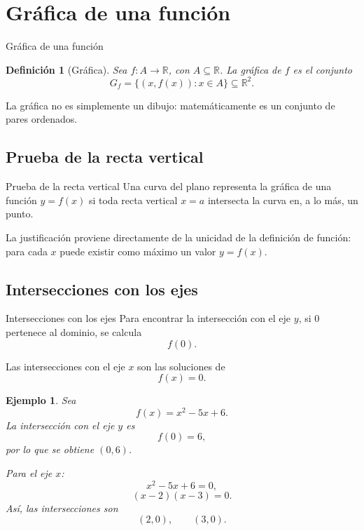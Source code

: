 \documentclass[aspectratio=169,10pt]{beamer}
\newtheorem{definicion}{Definición}
\newtheorem{ejemplo}{Ejemplo}
\newcommand{\R}{\mathbb{R}}
\begin{document}
\section{Gráfica de una función}
\begin{frame}{Gráfica de una función}
\begin{definicion}[Gráfica]
Sea $f:A\to\R$, con $A\subseteq\R$. La gráfica de $f$ es el conjunto
\[
G_f=\{(x,f(x)):x\in A\}\subseteq\R^2.
\]
\end{definicion}

La gráfica no es simplemente un dibujo: matemáticamente es un conjunto de
pares ordenados.
\end{frame}
\subsection{Prueba de la recta vertical}
\begin{frame}{Prueba de la recta vertical}
Una curva del plano representa la gráfica de una función $y=f(x)$ si toda
recta vertical $x=a$ intersecta la curva en, a lo más, un punto.

La justificación proviene directamente de la unicidad de la definición de
función: para cada $x$ puede existir como máximo un valor $y=f(x)$.
\end{frame}
\subsection{Intersecciones con los ejes}
\begin{frame}{Intersecciones con los ejes}
Para encontrar la intersección con el eje $y$, si $0$ pertenece al dominio, se
calcula
\[
f(0).
\]

Las intersecciones con el eje $x$ son las soluciones de
\[
f(x)=0.
\]

\begin{ejemplo}
Sea
\[
f(x)=x^2-5x+6.
\]
La intersección con el eje $y$ es
\[
f(0)=6,
\]
por lo que se obtiene $(0,6)$.

Para el eje $x$:
\[
x^2-5x+6=0,
\]
\[
(x-2)(x-3)=0.
\]
Así, las intersecciones son
\[
(2,0),\qquad(3,0).
\]
\end{ejemplo}

\end{frame}
\end{document}
